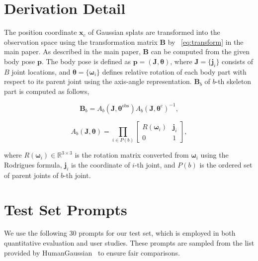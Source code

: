 \section{Derivation Detail}
\label{sec:derivation_detail}

The position coordinate $\mathbf{x}_c$ of Gaussian splats are transformed into the observation space using the transformation matrix $\mathbf{B}$ by ~\eqref{eq:transform} in the main paper. 
As described in the main paper,  $\mathbf{B}$ can be computed from the given body pose $\mathbf{p}$. The body pose is defined as $\mathbf{p} =(\mathbf{J}, \boldsymbol{\theta})$, where $\mathbf{J} = \{\mathbf{j}_i\}$ consists of $B$ joint locations, and $\boldsymbol{\theta} = \{\boldsymbol{\omega}_i\}$ defines relative rotation of each body part with respect to its parent joint using the axis-angle representation. $\mathbf{B}_b$ of $b$-th skeleton part is computed as follows,


\begin{equation}
\mathbf{B}_b=  A_b(\mathbf{J}, \boldsymbol{\theta}^{\text{obs}}) A_b(\mathbf{J}, \boldsymbol{\theta}^\text{c}) ^{-1},
\end{equation}

\begin{equation}
A_b(\mathbf{J}, \boldsymbol{\theta})=\prod_{i \in P(b)}\left[\begin{array}{cc}
R\left(\boldsymbol{\omega}_i\right) & \mathbf{j}_i \\
0 & 1
\end{array}\right],
\end{equation}

\noindent where $R(\boldsymbol{\omega}_i) \in\mathbb{R}^{3\times3}$ is the rotation matrix converted from $\boldsymbol{\omega}_i$ using the Rodrigues formula, $\mathbf{j}_i$ is the coordinate of $i$-th joint, and $P(b)$ is the ordered set of parent joints of $b$-th joint. 


\section{Test Set Prompts}
We use the following 30 prompts for our test set, which is employed in both quantitative evaluation and user studies. These prompts are sampled from the list provided by HumanGaussian~\cite{liu2024humangaussian} to ensure fair comparisons.

